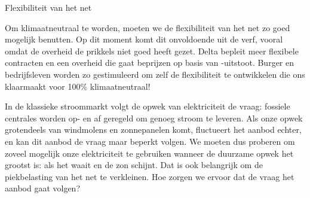 \begin{voorstel}{Flexibiliteit van het net}

\begin{samenvatting}
Om klimaatneutraal te worden, moeten we de flexibiliteit van het net zo goed mogelijk benutten. Op dit moment komt dit onvoldoende uit de verf, vooral omdat de overheid de prikkels niet goed heeft gezet. Delta bepleit meer flexibele contracten en een overheid die gaat beprijzen op basis van \COO-uitstoot. Burger en bedrijfsleven worden zo gestimuleerd om zelf de flexibiliteit te ontwikkelen die ons klaarmaakt voor 100\% klimaatneutraal!
\end{samenvatting}

\begin{multicols*}{2}
\raggedcolumns

\begin{uitdaging}
In de klassieke stroommarkt volgt de opwek van elektriciteit de vraag: fossiele centrales worden op- en af geregeld om genoeg stroom te leveren. Als onze opwek grotendeels van windmolens en zonnepanelen komt, fluctueert het aanbod echter, en kan dit aanbod de vraag maar beperkt volgen. We moeten dus proberen om zoveel mogelijk onze elektriciteit te gebruiken wanneer de duurzame opwek het grootst is: als het waait en de zon schijnt. Dat is ook belangrijk om de piekbelasting van het net te verkleinen. Hoe zorgen we ervoor dat de vraag het aanbod gaat volgen?
\end{uitdaging}

\begin{overwegingen}


\end{overwegingen}
\end{multicols*}
\end{voorstel}
